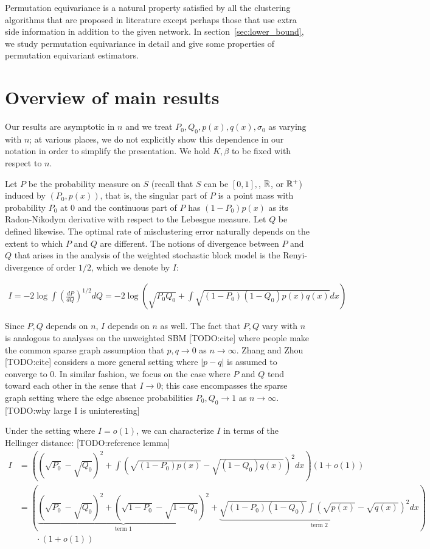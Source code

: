 \documentclass{article}
\begin{document}
Permutation equivariance is a natural property satisfied by all the clustering algorithms that are proposed in literature except perhaps those that use extra side information in addition to the given network. In section~\ref{sec:lower_bound}, we study permutation equivariance in detail and give some properties of permutation equivariant estimators.


\section{Overview of main results}

Our results are asymptotic in $n$ and we treat $P_0, Q_0, p(x), q(x), \sigma_0$ as varying with $n$; at various places, we do not explicitly show this dependence in our notation in order to simplify the presentation. We hold $K, \beta$ to be fixed with respect to $n$.

Let $P$ be the probability measure on $S$ (recall that $S$ can be $[0,1],$, ${\mathbb R}$, or ${\mathbb R}^+$) induced by $(P_0, p(x))$, that is, the singular part of $P$ is a point mass with probability $P_0$ at $0$ and the continuous part of $P$ has $(1-P_0)p(x)$ as its Radon-Nikodym derivative with respect to the Lebesgue measure. Let $Q$ be defined likewise. The optimal rate of misclustering error naturally depends on the extent to which $P$ and $Q$ are different. The notions of divergence between $P$ and $Q$ that arises in the analysis of the weighted stochastic block model is the Renyi-divergence of order $1/2$, which we denote by $I$:

\begin{align}
  I = -2 \log \int \left( \frac{dP}{dQ} \right)^{1/2} dQ
  = -2 \log \left( \sqrt{P_0 Q_0} + \int \sqrt{(1-P_0)(1-Q_0)p(x)q(x) } dx \right)
\end{align}

Since $P,Q$ depends on $n$, $I$ depends on $n$ as well. The fact that $P, Q$ vary with $n$ is analogous to analyses on the unweighted SBM [TODO:cite] where people make the common sparse graph assumption that $p, q \rightarrow 0$ as $n \rightarrow \infty$. Zhang and Zhou [TODO:cite] considers a more general setting where $|p - q|$ is assumed to converge to 0. In similar fashion, we focus on the case where $P$ and $Q$ tend toward each other in the sense that $I \rightarrow 0$; this case encompasses the sparse graph setting where the edge absence probabilities $P_0, Q_0 \rightarrow 1$ as $n \rightarrow \infty$.  [TODO:why large I is uninteresting]

Under the setting where $I = o(1)$, we can characterize $I$ in terms of the Hellinger distance: [TODO:reference lemma]
\begin{align}
I &= \left( (\sqrt{P_0} - \sqrt{Q_0})^2 + \int (\sqrt{(1-P_0)p(x)} - \sqrt{(1-Q_0)q(x)} )^2 dx \right) (1 + o(1)) \nonumber \\ 
 &= \left( \underbrace{(\sqrt{P_0} - \sqrt{Q_0})^2 + (\sqrt{1-P_0} - \sqrt{1-Q_0})^2}_{\textrm{term 1}} + 
             \underbrace{\sqrt{(1-P_0)(1-Q_0)} \int (\sqrt{p(x)} - \sqrt{q(x)} )^2 dx}_{\textrm{term 2}} \right) \nonumber \\
             & \qquad \cdot (1 + o(1)) \label{eqn:I_decompose} 
\end{align}
\end{document}
